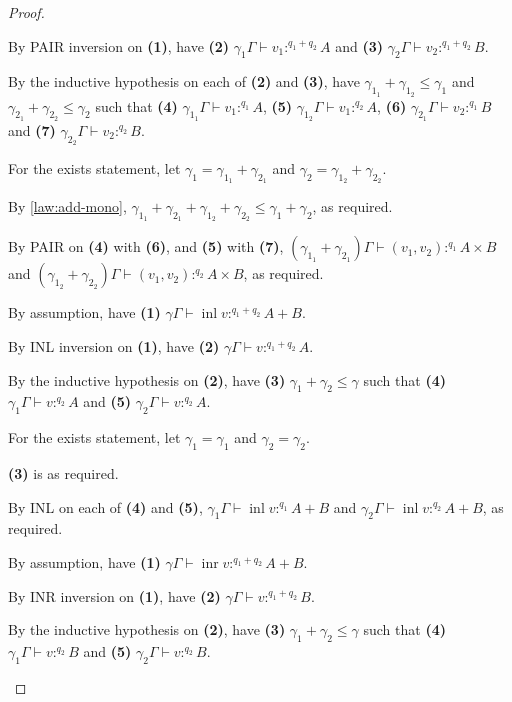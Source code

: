 \documentclass[acmsmall,screen,nonacm]{acmart}
\DeclareMathOperator{\inl}{\text{inl}}
\DeclareMathOperator{\inr}{\text{inr}}
\newcommand{\tee}{\vdash}
\begin{document}
\begin{proof}
\begin{description}
    By PAIR inversion on \textbf{(1)}, have \textbf{(2)} $\gamma_1\Gamma \tee v_1 :^{q_1 + q_2} A$ and \textbf{(3)} $\gamma_2\Gamma \tee v_2 :^{q_1 + q_2} B$.

    By the inductive hypothesis on each of \textbf{(2)} and \textbf{(3)}, have $\gamma_{1_1} + \gamma_{1_2} \le \gamma_1$ and $\gamma_{2_1} + \gamma_{2_2} \le \gamma_2$ such that \textbf{(4)} $\gamma_{1_1}\Gamma \tee v_1 :^{q_1} A$, \textbf{(5)} $\gamma_{1_2}\Gamma \tee v_1 :^{q_2} A$, \textbf{(6)} $\gamma_{2_1}\Gamma \tee v_2 :^{q_1} B$ and \textbf{(7)} $\gamma_{2_2}\Gamma \tee v_2 :^{q_2} B$.

    For the exists statement, let $\gamma_1 = \gamma_{1_1} + \gamma_{2_1}$ and $\gamma_2 = \gamma_{1_2} + \gamma_{2_2}$.

    By \ref{law:add-mono}, $\gamma_{1_1} + \gamma_{2_1} + \gamma_{1_2} + \gamma_{2_2} \le \gamma_1 + \gamma_2$, as required.

    By PAIR on \textbf{(4)} with \textbf{(6)}, and \textbf{(5)} with \textbf{(7)}, $(\gamma_{1_1} + \gamma_{2_1})\Gamma \tee (v_1, v_2) :^{q_1} A \times B$ and $(\gamma_{1_2} + \gamma_{2_2})\Gamma \tee (v_1, v_2) :^{q_2} A \times B$, as required.
    \\
    \item[Case INL.]
    By assumption, have \textbf{(1)} $\gamma\Gamma \tee \inl v :^{q_1 + q_2} A + B$.

    By INL inversion on \textbf{(1)}, have \textbf{(2)} $\gamma\Gamma \tee v :^{q_1 + q_2} A$.

    By the inductive hypothesis on \textbf{(2)}, have \textbf{(3)} $\gamma_1 + \gamma_2 \le \gamma$ such that \textbf{(4)} $\gamma_1\Gamma \tee v :^{q_2} A$ and \textbf{(5)} $\gamma_2\Gamma \tee v :^{q_2} A$.

    For the exists statement, let $\gamma_1 = \gamma_1$ and $\gamma_2 = \gamma_2$.

    \textbf{(3)} is as required.

    By INL on each of \textbf{(4)} and \textbf{(5)}, $\gamma_1\Gamma \tee \inl v :^{q_1} A + B$ and $\gamma_2\Gamma \tee \inl v :^{q_2} A + B$, as required.
    \\
    \item[Case INR.]
    By assumption, have \textbf{(1)} $\gamma\Gamma \tee \inr v :^{q_1 + q_2} A + B$.

    By INR inversion on \textbf{(1)}, have \textbf{(2)} $\gamma\Gamma \tee v :^{q_1 + q_2} B$.

    By the inductive hypothesis on \textbf{(2)}, have \textbf{(3)} $\gamma_1 + \gamma_2 \le \gamma$ such that \textbf{(4)} $\gamma_1\Gamma \tee v :^{q_2} B$ and \textbf{(5)} $\gamma_2\Gamma \tee v :^{q_2} B$.


\end{description}
\end{proof}
\end{document}
